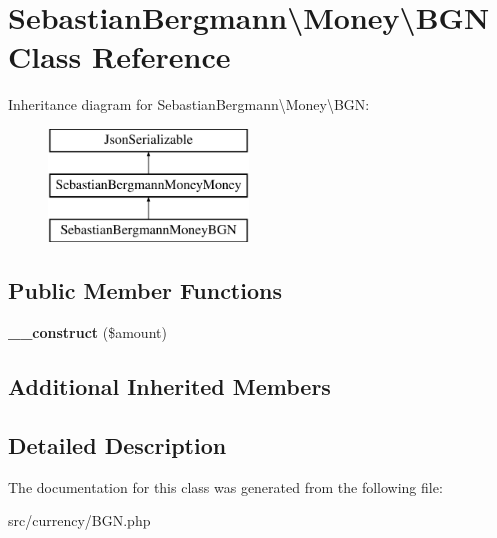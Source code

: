 \hypertarget{classSebastianBergmann_1_1Money_1_1BGN}{}\section{Sebastian\+Bergmann\textbackslash{}Money\textbackslash{}B\+G\+N Class Reference}
\label{classSebastianBergmann_1_1Money_1_1BGN}
Inheritance diagram for Sebastian\+Bergmann\textbackslash{}Money\textbackslash{}B\+G\+N\+:\begin{figure}[H]
\begin{center}
\leavevmode
\includegraphics[height=3.000000cm]{classSebastianBergmann_1_1Money_1_1BGN}
\end{center}
\end{figure}
\subsection*{Public Member Functions}
\begin{DoxyCompactItemize}
\item 
\hypertarget{classSebastianBergmann_1_1Money_1_1BGN_a8d342395a7dd2a99e13638902861d38c}{}{\bfseries \+\_\+\+\_\+construct} (\$amount)\label{classSebastianBergmann_1_1Money_1_1BGN_a8d342395a7dd2a99e13638902861d38c}

\end{DoxyCompactItemize}
\subsection*{Additional Inherited Members}


\subsection{Detailed Description}


The documentation for this class was generated from the following file\+:\begin{DoxyCompactItemize}
\item 
src/currency/B\+G\+N.\+php\end{DoxyCompactItemize}
